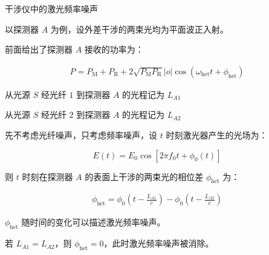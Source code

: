 \documentclass{beamer}
\begin{document}
\begin{frame}{干涉仪中的激光频率噪声}

    以探测器 $A$ 为例，设外差干涉的两束光均为平面波正入射。

    前面给出了探测器 $A$ 接收的功率为：

    $$
    \begin{aligned}
    P
    =P_{\mathrm{M}} + P_{\mathrm{R}} + 2\sqrt{P_{\mathrm{M}}P_{\mathrm{R}}}|o|\cos(\omega_{\mathrm{het}}t+\phi_{\mathrm{het}})
    \end{aligned}
    $$

    从光源 $S$ 经光纤 $1$ 到探测器 $A$ 的光程记为 $L_{A1}$

    从光源 $S$ 经光纤 $2$ 到探测器 $A$ 的光程记为 $L_{A2}$

    先不考虑光纤噪声，只考虑频率噪声，设 $t$ 时刻激光器产生的光场为：

    $$
    E(t)
    =E_0\cos[2\pi f_0 t+\phi_0(t)]
    $$

    则 $t$ 时刻在探测器 $A$ 的表面上干涉的两束光的相位差 $\phi_{\mathrm{het}} $ 为：
    
   $$
   \begin{aligned}
   \phi_{\mathrm{het}}
   =\phi_0\left(t-\frac{L_{A1}}{c}\right)-\phi_0\left(t-\frac{L_{A2}}{c}\right)
   \end{aligned}
   $$ 

   $\phi_{\mathrm{het}}$ 随时间的变化可以描述激光频率噪声。

   若 $L_{A1}=L_{A2}$，则 $\phi_{\mathrm{het}}=0$，此时激光频率噪声被消除。

\end{frame}
\end{document}
